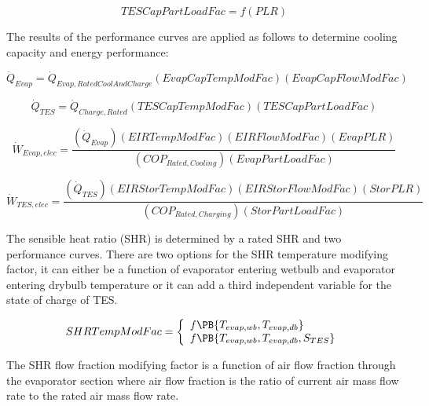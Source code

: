 \begin{equation}
TESCapPartLoadFac = f\left( {PLR} \right)
\end{equation}

The results of the performance curves are applied as follows to determine cooling capacity and energy performance:

\begin{equation}
{\dot Q_{Evap}} = {\dot Q_{Evap,RatedCoolAndCharge}}\left( {EvapCapTempModFac} \right)\left( {EvapCapFlowModFac} \right)
\end{equation}

\begin{equation}
{\dot Q_{TES}} = {\dot Q_{Charge,Rated}}\left( {TESCapTempModFac} \right)\left( {TESCapPartLoadFac} \right)
\end{equation}

\begin{equation}
{\dot W_{Evap,elec}} = \frac{{\left( {{{\dot Q}_{Evap}}} \right)\left( {EIRTempModFac} \right)\left( {EIRFlowModFac} \right)\left( {EvapPLR} \right)}}{{\left( {CO{P_{Rated,Cooling}}} \right)\left( {EvapPartLoadFac} \right)}}
\end{equation}

\begin{equation}
{\dot W_{TES,elec}} = \frac{{\left( {{{\dot Q}_{TES}}} \right)\left( {EIRStorTempModFac} \right)\left( {EIRStorFlowModFac} \right)\left( {StorPLR} \right)}}{{\left( {CO{P_{Rated,Charging}}} \right)\left( {StorPartLoadFac} \right)}}
\end{equation}

The sensible heat ratio (SHR) is determined by a rated SHR and two performance curves. There are two options for the SHR temperature modifying factor, it can either be a function of evaporator entering wetbulb and evaporator entering drybulb temperature or it can add a third independent variable for the state of charge of TES.

\begin{equation}
  SHRTempModFac = \left\{
    \begin{array}{l}
      f\PB{T_{evap,wb},T_{evap,db}} \\
      f\PB{T_{evap,wb},T_{evap,db},S_{TES}}
    \end{array}
  \right.
\end{equation}

The SHR flow fraction modifying factor is a function of air flow fraction through the evaporator section where air flow fraction is the ratio of current air mass flow rate to the rated air mass flow rate.

